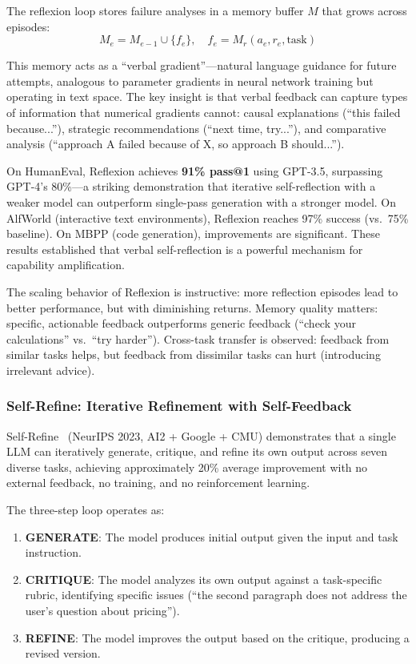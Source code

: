 The reflexion loop stores failure analyses in a memory buffer $M$ that grows across episodes:
\begin{equation}
M_e = M_{e-1} \cup \{f_e\}, \quad f_e = M_r(a_e, r_e, \text{task})
\end{equation}

This memory acts as a ``verbal gradient''---natural language guidance for future attempts, analogous to parameter gradients in neural network training but operating in text space. The key insight is that verbal feedback can capture types of information that numerical gradients cannot: causal explanations (``this failed because...''), strategic recommendations (``next time, try...''), and comparative analysis (``approach A failed because of X, so approach B should...'').

On HumanEval, Reflexion achieves \textbf{91\% pass@1} using GPT-3.5, surpassing GPT-4's 80\%---a striking demonstration that iterative self-reflection with a weaker model can outperform single-pass generation with a stronger model. On AlfWorld (interactive text environments), Reflexion reaches 97\% success (vs.\ 75\% baseline). On MBPP (code generation), improvements are significant. These results established that verbal self-reflection is a powerful mechanism for capability amplification.

The scaling behavior of Reflexion is instructive: more reflection episodes lead to better performance, but with diminishing returns. Memory quality matters: specific, actionable feedback outperforms generic feedback (``check your calculations'' vs.\ ``try harder''). Cross-task transfer is observed: feedback from similar tasks helps, but feedback from dissimilar tasks can hurt (introducing irrelevant advice).

\subsubsection{Self-Refine: Iterative Refinement with Self-Feedback}

Self-Refine~\citep{madaan2023selfrefine} (NeurIPS 2023, AI2 + Google + CMU) demonstrates that a single LLM can iteratively generate, critique, and refine its own output across seven diverse tasks, achieving approximately 20\% average improvement with no external feedback, no training, and no reinforcement learning.

The three-step loop operates as:
\begin{enumerate}
\item \textbf{GENERATE}: The model produces initial output given the input and task instruction.
\item \textbf{CRITIQUE}: The model analyzes its own output against a task-specific rubric, identifying specific issues (``the second paragraph does not address the user's question about pricing'').
\item \textbf{REFINE}: The model improves the output based on the critique, producing a revised version.
\end{enumerate}

